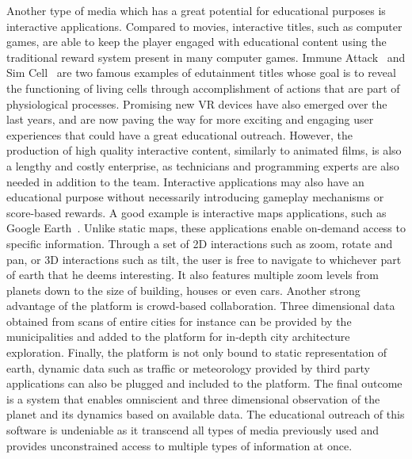 Another type of media which has a great potential for educational purposes is interactive applications.
Compared to movies, interactive titles, such as computer games, are able to keep the player engaged with educational content using the traditional reward system present in many computer games.
Immune Attack~\cite{immune2008} and Sim Cell~\cite{simcell2013} are two famous examples of edutainment titles whose goal is to reveal the functioning of living cells through accomplishment of actions that are part of physiological processes.
Promising new VR devices have also emerged over the last years, and are now paving the way for more exciting and engaging user experiences that could have a great educational outreach.
However, the production of high quality interactive content, similarly to animated films, is also a lengthy and costly enterprise, as technicians and programming experts are also needed in addition to the team.
Interactive applications may also have an educational purpose without necessarily introducing gameplay mechanisms or score-based rewards. 
A good example is interactive maps applications, such as Google Earth~\cite{gearth2001}.
Unlike static maps, these applications enable on-demand access to specific information.
Through a set of 2D interactions such as zoom, rotate and pan, or 3D interactions such as tilt, the user is free to navigate to whichever part of earth that he deems interesting.
It also features multiple zoom levels from planets down to the size of building, houses or even cars.
Another strong advantage of the platform is crowd-based collaboration.
Three dimensional data obtained from scans of entire cities for instance can be provided by the municipalities and added to the platform for in-depth city architecture exploration.
Finally, the platform is not only bound to static representation of earth, dynamic data such as traffic or meteorology provided by third party applications can also be plugged and included to the platform.
The final outcome is a system that enables omniscient and three dimensional observation of the planet and its dynamics based on available data.
The educational outreach of this software is undeniable as it transcend all types of media previously used and provides unconstrained access to multiple types of information at once. 

